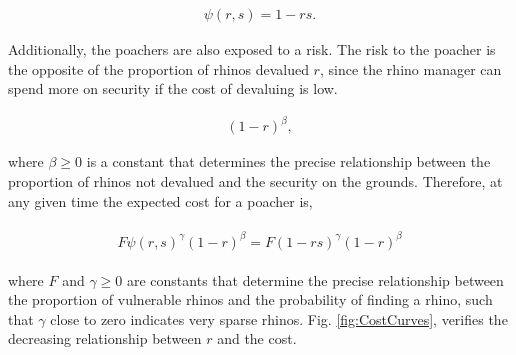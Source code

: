 \documentclass[10pt]{article}
\begin{document}
\begin{eqnarray}
	\label{eqn:psi}
	\psi(r, s) = 1 - rs.
\end{eqnarray}

Additionally, the poachers are also exposed to a risk. The risk to the poacher is
the opposite of the proportion of rhinos devalued \(r\), since the rhino manager
can spend more on security if the cost of devaluing is low.

\begin{eqnarray}
	\label{eqn:risk}
	(1 - r)^{\beta},
\end{eqnarray}

where \(\beta \geq 0\) is a constant that determines the precise relationship between
the proportion of rhinos not devalued and the security on the grounds. Therefore,
at any given time the expected cost for a poacher is, 

\begin{eqnarray}
	\label{eqn:individual_cost}
	\begin{array}{l}
	F \psi(r, s)^{\gamma} (1 - r)^{\beta} = F (1 - rs) ^{\gamma} (1 - r) ^{\beta}
	\end{array}
\end{eqnarray}

where \(F\) and \(\gamma \geq 0\) are constants that determine the precise relationship
between the proportion of vulnerable rhinos and the probability of finding a rhino,
such that \(\gamma\) close to zero indicates very sparse rhinos. Fig.
\ref{fig:CostCurves},  verifies the decreasing relationship between \(r\) and the
cost.
\end{document}
